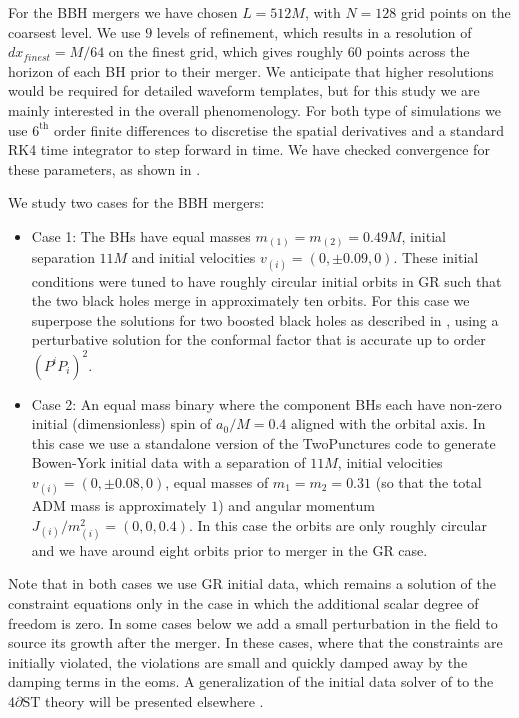 \documentclass[reprint,aps,amsmath,amssymb,twoside,prd,showkeys,superscriptaddress,nofootinbib]{revtex4-2}
\begin{document}
For the BBH mergers we have chosen $L=512M$, with $N=128$ grid points on the coarsest level. We use $9$ levels of refinement, which results in a resolution of $dx_{finest} = M/64$ on the finest grid, which gives roughly 60 points across the horizon of each BH prior to their merger. We anticipate that higher resolutions would be required for detailed waveform templates, but for this study we are mainly interested in the overall phenomenology. For both type of simulations we use $6^\text{th}$ order finite differences to discretise the spatial derivatives and a standard RK4 time integrator to step forward in time.  We have checked convergence for these parameters, as shown in \cite{short_paper}.

We study two cases for the BBH mergers:
\begin{itemize}
    \item Case 1: The BHs have equal masses $m_{(1)} = m_{(2)} = 0.49M$, initial separation $11M$ and initial velocities $v_{(i)} = (0, \pm0.09, 0)$. These initial conditions were tuned to have roughly circular initial orbits in GR such that the two black holes merge in approximately ten orbits. For this case we superpose the solutions for two boosted black holes as described in \cite{Baumgarte:2010ndz,Bowen:1980yu}, using a perturbative solution for the conformal factor that is accurate up to order $(P^i P_i)^2$.
    \item Case 2: An equal mass binary where the component BHs each have non-zero initial (dimensionless) spin of $a_0/M=0.4$ aligned with the orbital axis. In this case we use a standalone version of the TwoPunctures code \cite{Ansorg:2004ds} to generate Bowen-York initial data \cite{Bowen:1980yu} with a separation of $11M$, initial velocities $v_{(i)}=(0,\pm 0.08, 0)$, equal masses of $m_1=m_2=0.31$ (so that the total ADM mass is approximately $1$) and angular momentum $J_{(i)}/m_{(i)}^2=(0,0,0.4)$. In this case the orbits are only roughly circular and we have around eight orbits prior to merger in the GR case.%
\end{itemize}

Note that in both cases we use GR initial data, which remains a solution of the constraint equations only in the case in which the additional scalar degree of freedom is zero. In some cases below we add a small perturbation in the field to source its growth after the merger. In these cases, where that the constraints are initially violated, the violations are small and quickly damped away by the damping terms in the eoms. A generalization of the initial data solver of \cite{Aurrekoetxea:2022mpw} to the $4\partial\text{ST}$ theory will be presented elsewhere \cite{Brady_in_prep}.
\end{document}
